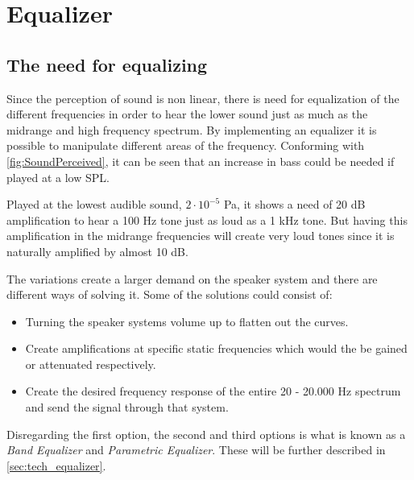 \section{Equalizer}\label{sec:tech_equalizer}
\subsection{The need for equalizing}

Since the perception of sound is non linear, there is need for equalization of the different frequencies in order to hear the lower sound just as much as the midrange and high frequency spectrum. By implementing an equalizer it is possible to manipulate different areas of the frequency. Conforming with \autoref{fig:SoundPerceived}, it can be seen that an increase in bass could be needed if played at a low \gls{SPL}.

Played at the lowest audible sound, $2\cdot 10^{-5}$ Pa, it shows a need of 20 dB amplification to hear a 100 Hz tone just as loud as a 1 kHz tone. But having this amplification in the midrange frequencies will create very loud tones since it is naturally amplified by almost 10 dB. 

The variations create a larger demand on the speaker system and there are different ways of solving it. Some of the solutions could consist of:

\begin{itemize}
\item Turning the speaker systems volume up to flatten out the curves.
\item Create amplifications at specific static frequencies which would the be gained or attenuated respectively.
\item Create the desired frequency response of the entire 20 - 20.000 Hz spectrum and send the signal through that system.
\end{itemize} 

Disregarding the first option, the second and third options is what is known as a \textit{Band Equalizer} and \textit{Parametric Equalizer}. These will be further described in \autoref{sec:tech_equalizer}.